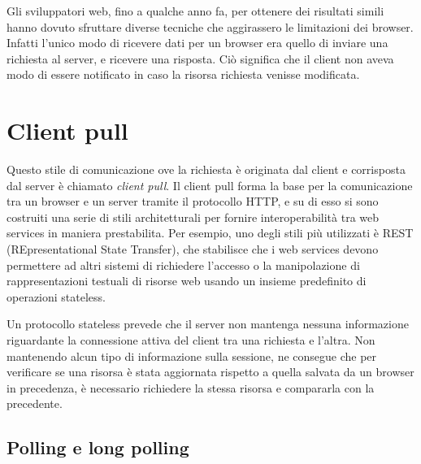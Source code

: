 \documentclass[12pt,a4paper,openright,twoside]{report}
\begin{document}
\bigskip

Gli sviluppatori web, fino a qualche anno fa, per ottenere dei risultati simili hanno dovuto sfruttare diverse tecniche che aggirassero le limitazioni dei browser. Infatti l’unico modo di ricevere dati per un browser era quello di inviare una richiesta al server, e ricevere una risposta. Ciò significa che il client non aveva modo di essere notificato in caso la risorsa richiesta venisse modificata.

\section{Client pull}\label{sec_clientpull}

Questo stile di comunicazione ove la richiesta è originata dal client e corrisposta dal server è chiamato \textit{client pull}. Il client pull forma la base per la comunicazione tra un browser e un server tramite il protocollo HTTP, e su di esso si sono costruiti una serie di stili architetturali per fornire interoperabilità tra web services in maniera prestabilita. Per esempio, uno degli stili più utilizzati è REST (REpresentational State Transfer), che stabilisce che i web services devono permettere ad altri sistemi di richiedere l’accesso o la manipolazione di rappresentazioni testuali di risorse web usando un insieme predefinito di operazioni stateless.

\bigskip

Un protocollo stateless prevede che il server non mantenga nessuna informazione riguardante la connessione attiva del client tra una richiesta e l’altra. Non mantenendo alcun tipo di informazione sulla sessione, ne consegue che per verificare se una risorsa è stata aggiornata rispetto a quella salvata da un browser in precedenza, è necessario richiedere la stessa risorsa e compararla con la precedente.

\subsection{Polling e long polling}
\end{document}

